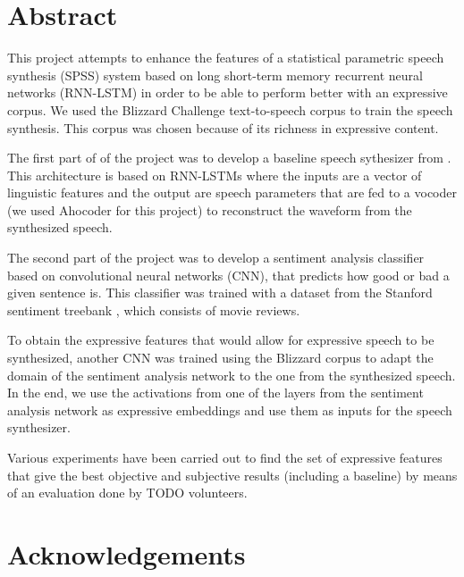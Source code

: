 \chapter*{Abstract}

This project attempts to enhance the features of a statistical parametric speech synthesis (SPSS) system based on long short-term memory recurrent neural networks (RNN-LSTM) in order to be able to perform better with an expressive corpus. We used the Blizzard Challenge \cite{blizzard} text-to-speech corpus to train the speech synthesis. This corpus was chosen because of its richness in expressive content.

The first part of of the project was to develop a baseline speech sythesizer from \cite{pascual2016deep}. This architecture is based on RNN-LSTMs where the inputs are a vector of linguistic features and the output are speech parameters that are fed to a vocoder (we used Ahocoder \cite{vocoder_ah} for this project) to reconstruct the waveform from the synthesized speech.

The second part of the project was to develop a sentiment analysis classifier based on convolutional neural networks (CNN), that predicts how good or bad a given sentence is. This classifier was trained with a dataset from the Stanford sentiment treebank \cite{socher2013recursive}, which consists of movie reviews.

To obtain the expressive features that would allow for expressive speech to be synthesized, another CNN was trained using the Blizzard corpus to adapt the domain of the sentiment analysis network to the one from the synthesized speech. In the end, we use the activations from one of the layers from the sentiment analysis network as expressive embeddings and use them as inputs for the speech synthesizer.

Various experiments have been carried out to find the set of expressive features that give the best objective and subjective results (including a baseline) by means of an evaluation done by TODO volunteers.




\chapter*{Acknowledgements}
